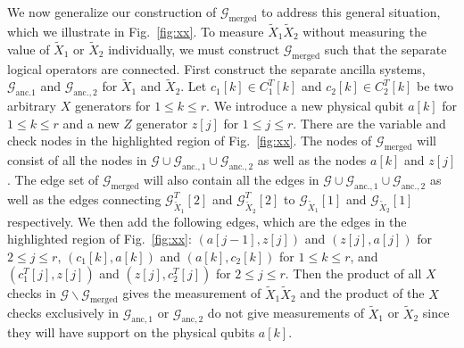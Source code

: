 \documentclass[reprint,
superscriptaddress,
 amsmath,amssymb,
 aps, longbibliography
]{revtex4-1}
\begin{document}
We now generalize our construction of $\mathcal{G}_{\textrm{merged}}$ to address this general situation, which we illustrate in Fig.~\ref{fig:xx}.
To measure $\tilde{X}_1 \tilde{X}_2$ without measuring the value of $\tilde{X}_1$ or $  \tilde{X}_2$ individually, we must construct $\mathcal{G}_\textrm{merged}$ such that the separate logical operators are connected. First construct the separate  ancilla systems, $\mathcal{G}_{\text{anc}. 1}$ and $\mathcal{G}_{\text{anc}., 2}$ for $\tilde{X}_1$ and $\tilde{X}_2$. Let $c_1[k] \in C^T_1[k]$ and $c_2[k] \in C^T_2[k]$ be two arbitrary $X$ generators for $1 \leq k \leq r$. We introduce a new physical qubit $a[k]$ for $1 \leq k \leq r$ and a new $Z$ generator $z[j]$ for $1 \leq j \leq r$. There are the variable and check nodes in the highlighted region of Fig.~\ref{fig:xx}. The nodes of $\mathcal{G}_\textrm{merged}$ will consist of all the nodes in $\mathcal{G} \cup \mathcal{G}_{\text{anc}., 1} \cup \mathcal{G}_{\text{anc}., 2}$ as well as the nodes $a[k]$ and $z[j]$. The edge set of $\mathcal{G}_\textrm{merged}$ will also contain all the edges in $\mathcal{G} \cup \mathcal{G}_{\text{anc}., 1} \cup \mathcal{G}_{\text{anc}., 2}$ as well as the edges connecting $\mathcal{G}^T_{\tilde{X}_1}[2]$ and $\mathcal{G}^T_{\tilde{X}_2}[2]$ to $\mathcal{G}_{\tilde{X}_1}[1]$ and $\mathcal{G}_{\tilde{X}_2}[1]$ respectively. We then add the following edges, which are the edges in the highlighted region of Fig.~\ref{fig:xx}: $(a[j-1], z[j])$ and $(z[j], a[j])$ for $2 \leq j \leq r$, $(c_1[k], a[k])$ and $(a[k], c_2[k])$ for $1 \leq k \leq r$, and $(c_1^T[j], z[j])$ and $(z[j], c^T_2[j])$ for $2 \leq j \leq r$. Then the product of all $X$ checks in $\mathcal{G}\backslash \mathcal{G}_{\textrm{merged}}$ gives the measurement of $\tilde{X}_1 \tilde{X}_2$ and the product of the $X$ checks exclusively in $\mathcal{G}_{\textrm{anc}, 1}$ or $\mathcal{G}_{\textrm{anc}, 2}$ do not give measurements of $\tilde{X}_1$ or $\tilde{X}_2$ since they will have support on the physical qubits $a[k]$.
\end{document}
